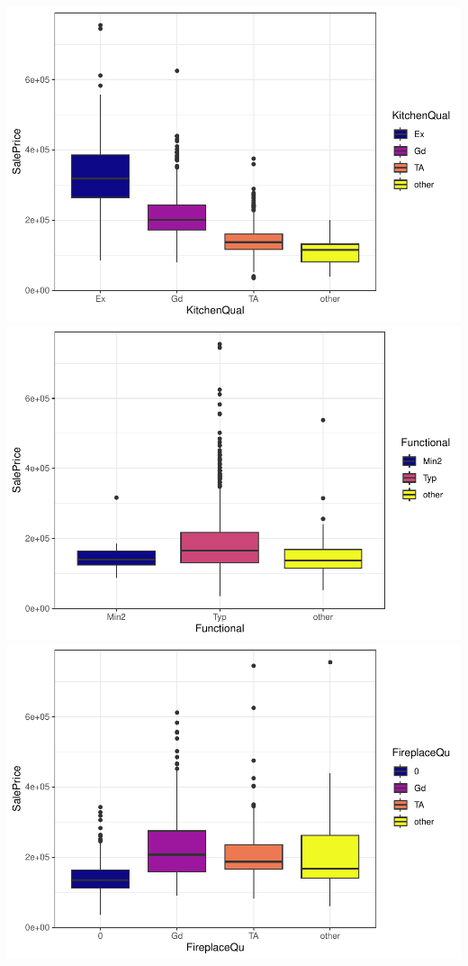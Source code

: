 \documentclass[
]{article}
\begin{document}
\includegraphics{report_files/figure-latex/categorical variables-25.pdf}
\includegraphics{report_files/figure-latex/categorical variables-26.pdf}
\includegraphics{report_files/figure-latex/categorical variables-27.pdf}
\end{document}
